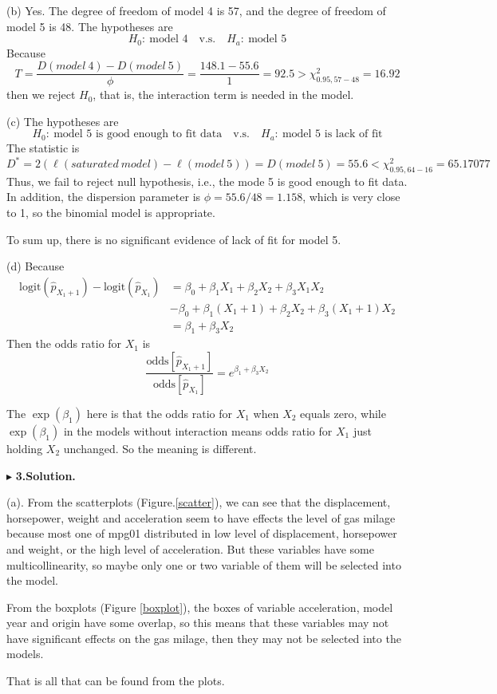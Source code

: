 \documentclass[letterpaper, 12pt]{article}
\newcommand{\ba}{$$\begin{aligned}}
\newcommand{\ea}{\end{aligned}$$}
\begin{document}
(b) Yes. The degree of freedom of model 4 is 57, and the degree of freedom of model 5 is 48. The hypotheses are
$$
H_0:~\text{model 4}\quad\text{v.s.}\quad H_a:~\text{model 5}
$$
Because 
$$
T=\frac{D(model~4)-D(model~5)}{\phi}=\frac{148.1-55.6}{1}=92.5>\chi^2_{0.95,57-48}=16.92
$$
then we reject $H_0$, that is, the interaction term is needed in the model.


(c) The hypotheses are
$$
H_0:~\text{model 5 is good enough to fit data}\quad\text{v.s.}\quad H_a:~\text{model 5 is lack of fit}
$$
The statistic is
$$
D^*=2(\ell(saturated~model)-\ell(model~5))=D(model~5)=55.6<\chi^2_{0.95,64-16}=65.17077
$$
Thus, we fail to reject null hypothesis, i.e., the mode 5 is good enough to fit data. In addition, the dispersion parameter is $\phi=55.6/48=1.158$, which is very close to 1, so the binomial model is appropriate.

To sum up, there is no significant evidence of lack of fit for model 5.


(d) Because
\ba
\text{logit}(\hat{p}_{X_1+1})-\text{logit}(\hat{p}_{X_1})&=\beta_0+\beta_1X_1+\beta_2X_2+\beta_3X_1X_2\\
&-\beta_0+\beta_1(X_1+1)+\beta_2X_2+\beta_3(X_1+1)X_2\\
&=\beta_1+\beta_3X_2
\ea
Then the odds ratio for $X_1$ is 
$$
\frac{\text{odds}[\hat{p}_{X_1+1}]}{\text{odds}[\hat{p}_{X_1}]}=e^{\beta_1+\beta_3X_2}
$$

The $\exp(\beta_1)$ here is that the odds ratio for $X_1$ when $X_2$ equals zero, while $\exp(\beta_1)$ in the models without interaction means odds ratio for $X_1$ just holding $X_2$ unchanged. So the meaning is different.


$\blacktriangleright$ \textbf{3.\quad Solution.} 


(a). From the scatterplots (Figure.\ref{scatter}), we can see that the displacement, horsepower, weight and acceleration seem to have effects the level of gas milage because most one of mpg01 distributed in low level of displacement, horsepower and weight, or the high level of acceleration. But these variables have some multicollinearity, so maybe only one or two variable of them will be selected into the model.

From the boxplots (Figure \ref{boxplot}), the boxes of variable acceleration, model year and origin have some overlap, so this means that these variables may not have significant effects on the gas milage, then they may not be selected into the models.

That is all that can be found from the plots.
\end{document}
